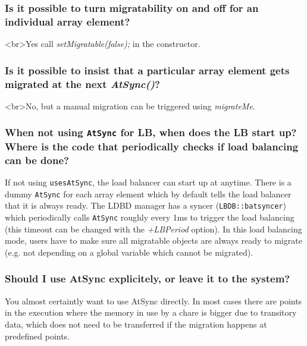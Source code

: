 \subsubsection{Is it possible to turn migratability on and off for an individual array
element?}

<br>Yes call {\em  setMigratable(false);} in the constructor.

\subsubsection{Is it possible to insist that a particular array element gets migrated
at the next {\em AtSync()}?}

<br>No, but a manual migration can be triggered using {\em migrateMe}.


\subsubsection{When not using {\tt AtSync} for LB, when does the LB start
up? Where is the code that periodically checks if load balancing can be
done?}

If not using {\tt usesAtSync}, the load balancer can start up at
anytime. There is a dummy {\tt AtSync} for each array element which
by default tells the load balancer that it is always ready. The LDBD manager
has a syncer ({\tt LBDB::batsyncer}) which periodically calls {\tt AtSync}
roughly every 1ms to trigger the load balancing (this timeout can be changed
with the {\em +LBPeriod} option). In this load balancing
mode, users have to make sure all migratable objects are always ready to
migrate (e.g. not depending on a global variable which cannot be migrated).

\subsubsection{Should I use AtSync explicitely, or leave it to the system?}

You almost certaintly want to use AtSync directly. In most cases there are
points in the execution where the memory in use by a chare is bigger due to
transitory data, which does not need to be transferred if the migration happens
at predefined points.


